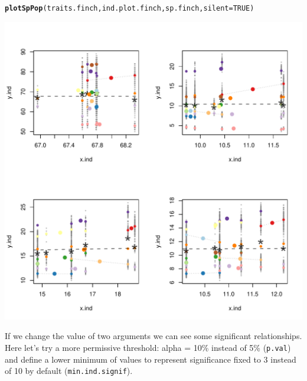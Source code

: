 \documentclass[12pt]{article}\usepackage[]{graphicx}\usepackage[]{color}
\makeatletter
\def\maxwidth{ %
  \ifdim\Gin@nat@width>\linewidth
    \linewidth
  \else
    \Gin@nat@width
  \fi
}
\newcommand{\hlnum}[1]{\textcolor[rgb]{0.686,0.059,0.569}{#1}}%
\newcommand{\hlstd}[1]{\textcolor[rgb]{0.345,0.345,0.345}{#1}}%
\newcommand{\hlkwc}[1]{\textcolor[rgb]{0.333,0.667,0.333}{#1}}%
\newcommand{\hlkwd}[1]{\textcolor[rgb]{0.737,0.353,0.396}{\textbf{#1}}}%
\newenvironment{kframe}{%
 \def\at@end@of@kframe{}%
 \ifinner\ifhmode%
  \def\at@end@of@kframe{\end{minipage}}%
  \begin{minipage}{\columnwidth}%
 \fi\fi%
 \def\FrameCommand##1{\hskip\@totalleftmargin \hskip-\fboxsep
 \colorbox{shadecolor}{##1}\hskip-\fboxsep
     \hskip-\linewidth \hskip-\@totalleftmargin \hskip\columnwidth}%
 \MakeFramed {\advance\hsize-\width
   \@totalleftmargin\z@ \linewidth\hsize
   \@setminipage}}%
 {\par\unskip\endMakeFramed%
 \at@end@of@kframe}
\newenvironment{knitrout}{}{} %
\makeatother
\begin{document}
\begin{knitrout}
\color{fgcolor}\begin{kframe}
\begin{alltt}
\hlkwd{plotSpPop}\hlstd{(traits.finch, ind.plot.finch, sp.finch,} \hlkwc{silent} \hlstd{=} \hlnum{TRUE}\hlstd{)}
\end{alltt}
\end{kframe}
\includegraphics[width=\maxwidth]{figure/unnamed-chunk-27-1} 

\end{knitrout}

If we change the value of two arguments we can see some significant relationships. Here let's try a more permissive threshold: alpha = 10\% instead of 5\% (\texttt{p.val}) and define a lower minimum of values to represent significance  fixed to 3 instead of 10 by default (\texttt{min.ind.signif}). 

\newpage
\end{document}
